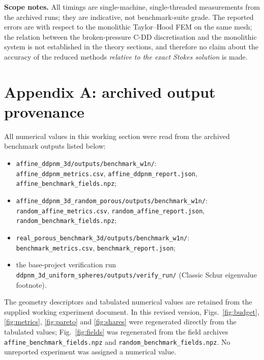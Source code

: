 \documentclass[11pt,a4paper]{article}
\begin{document}
\textbf{Scope notes.}  All timings are single-machine, single-threaded
measurements from the archived runs; they are indicative, not
benchmark-suite grade.  The reported errors are with respect to the
monolithic Taylor--Hood FEM on the same mesh; the relation between the
broken-pressure C-DD discretisation and the monolithic system is not
established in the theory sections, and therefore no claim about the
accuracy of the reduced methods \emph{relative to the exact Stokes
solution} is made.

\section*{Appendix A: archived output provenance}
\label{app:provenance}

All numerical values in this working section were read from the archived
benchmark outputs listed below:
\begin{itemize}[nosep,leftmargin=*]
\item \texttt{affine\_ddpnm\_3d/outputs/benchmark\_w1n/}:\\
  \texttt{affine\_ddpnm\_metrics.csv}, \texttt{affine\_ddpnm\_report.json},
  \texttt{affine\_benchmark\_fields.npz};
\item \texttt{affine\_ddpnm\_3d\_random\_porous/outputs/benchmark\_w1n/}:\\
  \texttt{random\_affine\_metrics.csv}, \texttt{random\_affine\_report.json},
  \texttt{random\_benchmark\_fields.npz};
\item \texttt{real\_porous\_benchmark\_3d/outputs/benchmark\_w1n/}:\\
  \texttt{benchmark\_metrics.csv}, \texttt{benchmark\_report.json};
\item the base-project verification run\\
  \texttt{ddpnm\_3d\_uniform\_spheres/outputs/verify\_run/} (Classic
  Schur eigenvalue footnote).
\end{itemize}
The geometry descriptors and tabulated numerical values are retained
from the supplied working experiment document.  In this revised version,
Figs.~\ref{fig:budget}, \ref{fig:metrics}, \ref{fig:pareto} and
\ref{fig:shares} were regenerated directly from the tabulated values;
Fig.~\ref{fig:fields} was regenerated from the field archives
\texttt{affine\_benchmark\_fields.npz} and
\texttt{random\_benchmark\_fields.npz}.  No unreported experiment was
assigned a numerical value.
\end{document}

